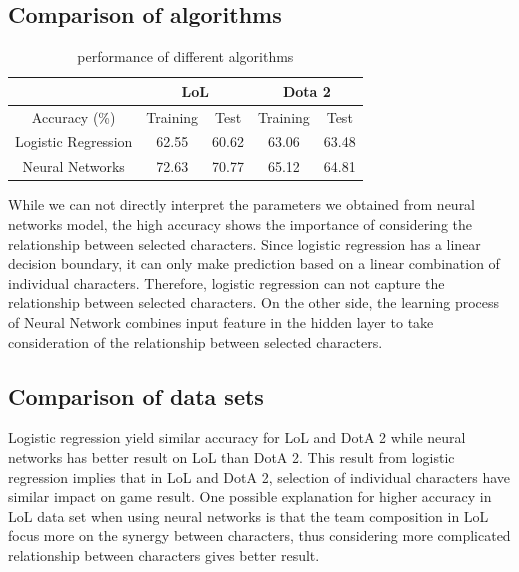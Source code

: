 \documentclass[conference]{IEEEtran}
\begin{document}
\subsection{Comparison of algorithms}

\begin{table}[h]
\caption{performance of different algorithms}
\begin{adjustbox}{width=3.5in}
\begin{tabular}{|c |c |c |c |c |}
\hline
\toprule
                       & \multicolumn{2}{c|}{LoL}    & \multicolumn{2}{c|}{Dota 2}   \\
\midrule
Accuracy (\%)                       & Training   & Test  & Training  & Test  \\ \hline
Logistic Regression    & 62.55         & 60.62     & 63.06         & 63.48     \\ \hline
Neural Networks       & 72.63        & 70.77     & 65.12        &64.81     \\
\bottomrule
\end{tabular}
\end{adjustbox}
\end{table}

While we can not directly interpret the parameters we obtained from neural networks model, the high accuracy shows the importance of considering the relationship between selected characters. Since logistic regression has a linear decision boundary, it can only make prediction based on a linear combination of individual characters. Therefore, logistic regression can not capture the relationship between selected characters. On the other side, the learning process of Neural Network combines input feature in the hidden layer to take consideration of the relationship between selected characters.

\subsection{Comparison of data sets}
Logistic regression yield similar accuracy for LoL and DotA 2 while neural networks has better result on LoL than DotA 2. This result from logistic regression implies that in LoL and DotA 2, selection of individual characters have similar impact on game result. One possible explanation for higher accuracy in LoL data set when using neural networks is that the team composition in LoL focus more on the synergy between characters, thus considering more complicated relationship between characters gives better result.
\end{document}
